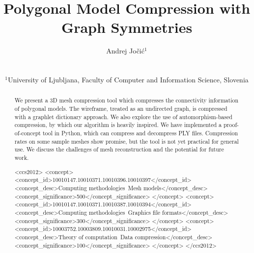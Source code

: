 \documentclass{egpubl}
\title[Polygonal Model Compression]%
      {Polygonal Model Compression with Graph Symmetries}
\author[Andrej Jočić]
{\parbox{\textwidth}{\centering%
        Andrej Jočić$^{1}$ 
        }
        \\
{\parbox{\textwidth}{\centering %
         $^1$University of Ljubljana, Faculty of Computer and Information Science, Slovenia
       }
}
}
\begin{document}

\maketitle
\begin{abstract}

We present a 3D mesh compression tool which compresses the connectivity information of polygonal models. The wireframe, treated as an undirected graph, is compressed with a graphlet dictionary approach. We also explore the use of automorphism-based compression, by which our algorithm is heavily inspired. We have implemented a proof-of-concept tool in Python, which can compress and decompress PLY files. Compression rates on some sample meshes show promise, but the tool is not yet practical for general use. We discuss the challenges of mesh reconstruction and the potential for future work. 

\begin{CCSXML}
    <ccs2012>
    <concept>
    <concept_id>10010147.10010371.10010396.10010397</concept_id>
    <concept_desc>Computing methodologies~Mesh models</concept_desc>
    <concept_significance>500</concept_significance>
    </concept>
    <concept>
    <concept_id>10010147.10010371.10010387.10010394</concept_id>
    <concept_desc>Computing methodologies~Graphics file formats</concept_desc>
    <concept_significance>300</concept_significance>
    </concept>
    <concept>
    <concept_id>10003752.10003809.10010031.10002975</concept_id>
    <concept_desc>Theory of computation~Data compression</concept_desc>
    <concept_significance>100</concept_significance>
    </concept>
</ccs2012>
\end{CCSXML}



\printccsdesc   
\end{abstract}  
\end{document}

